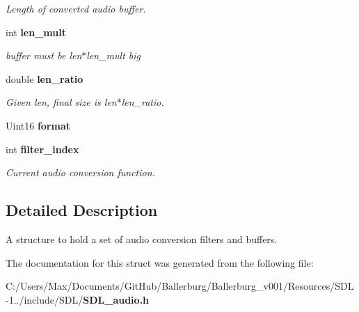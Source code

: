 \begin{DoxyCompactItemize}
\begin{DoxyCompactList}\small\item\em Length of converted audio buffer. \end{DoxyCompactList}\item 
int {\bf len\+\_\+mult}\label{struct_s_d_l___audio_c_v_t_ac9662d47cf2348b82b27b151150116b0}

\begin{DoxyCompactList}\small\item\em buffer must be len$\ast$len\+\_\+mult big \end{DoxyCompactList}\item 
double {\bf len\+\_\+ratio}\label{struct_s_d_l___audio_c_v_t_a5628ff5ccf711de9d77c0a4a9f57d2f0}

\begin{DoxyCompactList}\small\item\em Given len, final size is len$\ast$len\+\_\+ratio. \end{DoxyCompactList}\item 
Uint16 {\bfseries format}\label{struct_s_d_l___audio_c_v_t_a020b6e1c01089169921ddb0c1e7f08d2}

\item 
int {\bf filter\+\_\+index}\label{struct_s_d_l___audio_c_v_t_a35093b3ad3331c17416c593a76012b63}

\begin{DoxyCompactList}\small\item\em Current audio conversion function. \end{DoxyCompactList}\end{DoxyCompactItemize}


\subsection{Detailed Description}
A structure to hold a set of audio conversion filters and buffers. 

The documentation for this struct was generated from the following file\+:\begin{DoxyCompactItemize}
\item 
C\+:/\+Users/\+Max/\+Documents/\+Git\+Hub/\+Ballerburg/\+Ballerburg\+\_\+v001/\+Resources/\+S\+D\+L-\/1../include/\+S\+D\+L/{\bf S\+D\+L\+\_\+audio.\+h}\end{DoxyCompactItemize}
